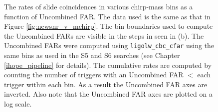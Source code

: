 \begin{figure}[p]
\begin{center}
\end{center}
\caption{The rates of slide coincidences in various chirp-mass bins as a function of Uncombined \ac{FAR}. The data used is the same as that in Figure \ref{fig:newsnr_v_mchirp}. The bin boundaries used to compute the Uncombined \acp{FAR} are visible in the steps in seen in (b). The Uncombined \acp{FAR} were computed using \texttt{ligolw\_cbc\_cfar} using the same bins as used in the S5 and S6 searches (see Chapter \ref{ihope_pipeline} for details). The cumulative rates are computed by counting the number of triggers with an Uncombined \ac{FAR} $<$ each trigger within each bin. As a result the Uncombined \ac{FAR} axes are inverted. Also note that the Uncombined \ac{FAR} axes are plotted on a log scale.}
\label{fig:ufar_v_mchirp}
\end{figure}

